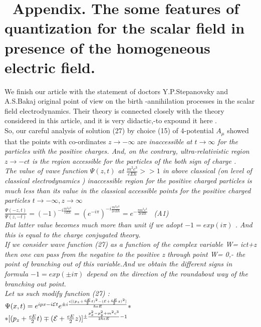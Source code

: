 \documentclass[a4paper,12pt] {article}
\begin{document}
 \section *{\ Appendix.  The some features of quantization for the scalar field in presence of the homogeneous electric field.}
 We finish our article with the statement of doctors Y.P.Stepanovsky and A.S.Bakaj original point of
 view on the birth -annihilation processes in the scalar field
 electrodynamics. Their theory is connected closely with the theory considered in this article, and it is
very didactic,-to expound it here .\\ So, our careful analysis of solution (27) by choice (15) of 4-potential
 $ A_\mu $  showed that the points with co-ordinates $ z \to -\infty $ are  \it inaccessible \rm at
 $ t \to \infty $ for the particles with the positive charges. And, on the contrary, ultra-relativistic region
$ z \to -ct $ is the region  \it  accessible for the particles of the both sign of charge .\\  \rm The value of
vawe function $\Psi (z,t) $ at $\frac { m^2 c^3}{e E \hbar} >>1$ in above classical (on level of  \it
 classical electrodynamics \rm)  inaccessible region for the  positive charged particles is  \it much less
than its value in the classical accessible points for the  positive charged particles \rm
  $ t \to - \infty ,z \to  \infty $ \\ $ \frac {\Psi (-z,t)}{\Psi (z,-t)} = (-1)^{-i \frac { m^2 c^3}{e E \hbar}}  =(e^{-i\pi}) ^{-i \frac { m^2 c^3}{2e E \hbar}} =e^{-\frac {\pi m^2 c^3}{2e E \hbar}} $ \ (A1)
\\ But latter value becomes  \it  much more than unit \rm  if we adopt  $ -1=exp(i\pi)$ . And this is equal to
 the \it  charge conjugated theory.\\  \rm If we consider wave function (27) as a  function of the complex
variable W= ict+z then one can pass from the negative to the positive z through point W= 0,- \it the
  point of branching out of this  variable.\rm  And we obtain the  \it different \rm  signs in formula
 $ -1=exp(\pm i \pi)$  \it  depend on the direction of the roundabout way of the branching out point. \\
\rm Let us  such modify  function (27)  :
\\ $ \Psi (x,t)= e^{ipx- i{\cal E} t} e^{\pm i\frac {c [(p_z+\frac {eE}{2} t)^2-({\cal E}+\frac {eE}{2}z)^2]}{\hbar eE}} * $
\\$ * [(p_z+ \frac {eE}{2} t) \mp ({\cal E}+\frac {eE}{2} z)]^{\pm \frac {p_x^2-p_y^2+ m^2c^3}{2\hbar eE}-1 } $
\end{document}
